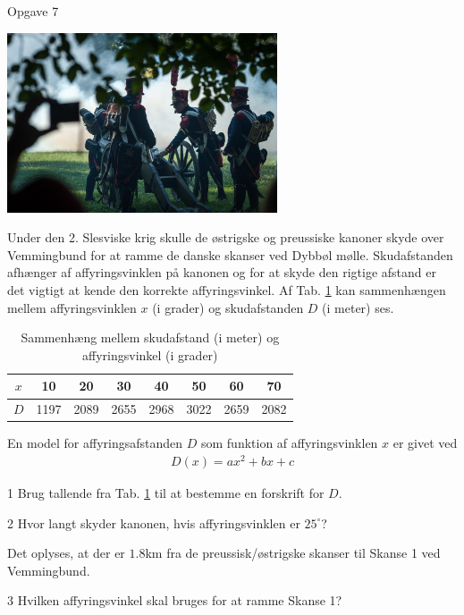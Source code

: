 \begin{opgavetekst}{Opgave 7}
	\begin{center}
		\includegraphics[width=0.6\textwidth]{Billeder/kanon.jpg}
	\end{center}
	Under den 2. Slesviske krig skulle de østrigske og preussiske kanoner skyde over Vemmingbund for at ramme de danske skanser ved Dybbøl mølle. Skudafstanden afhænger af affyringsvinklen på kanonen
	og for at skyde den rigtige afstand er det vigtigt at kende den korrekte affyringsvinkel. Af Tab.  \ref{tab:kanon} kan sammenhængen mellem affyringsvinklen $x$ (i grader) og skudafstanden $D$
	(i meter) ses.
	\begin{table}[H]
		\centering
		\begin{tabular}{c|c|c|c|c|c|c|c}
		$x$ &10 & 20 & 30 & 40 & 50 & 60 & 70 \\
		\hline
		$D$ & 1197 & 2089 & 2655 & 2968 & 3022 & 2659 & 2082
		\end{tabular}
		\caption{Sammenhæng mellem skudafstand (i meter) og affyringsvinkel (i grader)}
		\label{tab:kanon}
	\end{table}\phantom{h}
	En model for affyringsafstanden $D$ som funktion af affyringsvinklen $x$ er givet ved
	\begin{align*}
		D(x) = ax^2+bx+c
	\end{align*}
\end{opgavetekst}
\begin{delopgave}{}{1}
	Brug tallende fra Tab. \ref{tab:kanon} til at bestemme en forskrift for $D$.
\end{delopgave}
\begin{delopgave}{}{2}
	Hvor langt skyder kanonen, hvis affyringsvinklen er $25^\circ$?
\end{delopgave}
\begin{meretekst}
	Det oplyses, at der er $1.8$km fra de preussisk/østrigske skanser til Skanse 1 ved Vemmingbund. 
\end{meretekst}
\begin{delopgave}{}{3}
	Hvilken affyringsvinkel skal bruges for at ramme Skanse 1?
\end{delopgave}
